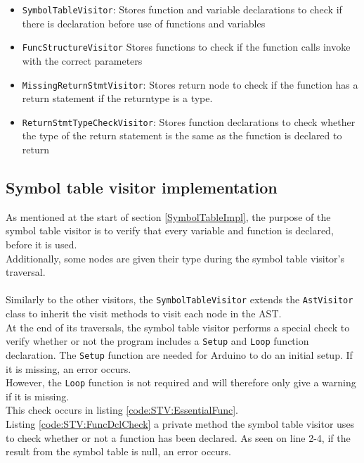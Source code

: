 \begin{itemize}
    \item \texttt{SymbolTableVisitor}: Stores function and variable declarations to check if there is declaration before use of functions and variables
    \item \texttt{FuncStructureVisitor} Stores functions to check if the function calls invoke with the correct parameters
    \item \texttt{MissingReturnStmtVisitor}: Stores return node to check if the function has a return statement if the returntype is a type.
    \item \texttt{ReturnStmtTypeCheckVisitor}: Stores function declarations to check whether the type of the return statement is the same as the function is declared to return
\end{itemize}

\subsection{Symbol table visitor implementation}
As mentioned at the start of section \ref{SymbolTableImpl}, the purpose of the symbol table visitor is to verify that every variable and function is declared, before it is used.\\
Additionally, some nodes are given their type during the symbol table visitor’s traversal.
\\\\
Similarly to the other visitors, the \texttt{SymbolTableVisitor} extends the \texttt{AstVisitor} class to inherit the visit methods to visit each node in the AST.\\
At the end of its traversals, the symbol table visitor performs a special check to verify whether or not the program includes a \texttt{Setup} and \texttt{Loop} function declaration. The \texttt{Setup} function are needed for Arduino to do an initial setup. If it is missing, an error occurs.\\
However, the \texttt{Loop} function is not required and will therefore only give a warning if it is missing.\\
This check occurs in listing \ref{code:STV:EssentialFunc}.\\

\noindent\newline
Listing \ref{code:STV:FuncDclCheck} a private method the symbol table visitor uses to check whether or not a function has been declared. As seen on line 2-4, if the result from the symbol table is null, an error occurs. 

\noindent